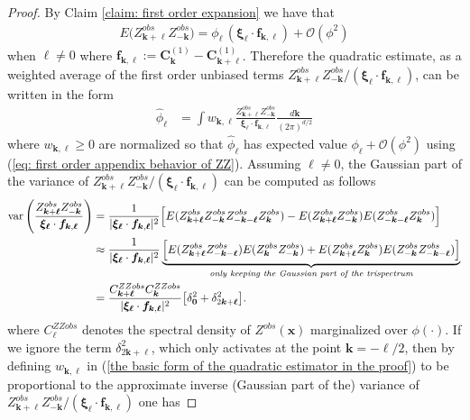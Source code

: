 \documentclass[10pt,noinfoline]{imsart}
\newcommand{\bs}{\boldsymbol}
\begin{document}
\begin{proof}
By Claim \ref{claim: first order expansion} we have that
\begin{align}
\label{eq: first order appendix behavior of ZZ}
E\big(Z^{obs}_{\bs k+\bs \ell}Z^{obs}_{-\bs k}\big)
= \phi_{\bs \ell}\, (\bs \xi_{\bs \ell}\cdot \bs f_{\bs k,\bs\ell})+ \mathcal O(\phi^2)
\end{align}
 when $\bs \ell\neq 0$ where $\bs f_{\bs k,\bs \ell}:= \bs C_{\bs k}^{(1)} -  \bs C_{\bs k+\bs \ell}^{(1)}$.
 Therefore the quadratic estimate, as a weighted average of the first order unbiased terms $Z^{obs}_{\bs k+\bs \ell}Z^{obs}_{-\bs k}/(\bs \xi_{\bs \ell}\cdot \bs f_{\bs k,\bs\ell})$, can be written in the form
\begin{align}
    \label{the basic form of the quadratic estimator in the proof}
\hat\phi_{\bs\ell}
& = \int w_{\bs k,\bs \ell}\frac{Z^{obs}_{\bs k+\bs \ell}Z^{obs}_{-\bs k}}{\bs \xi_{\bs \ell}\cdot \bs f_{\bs k,\bs\ell}} \frac{d\bs k}{{(2\pi)}^{d/2}}
\end{align}
where $w_{\bs k,\bs\ell}\geq 0$ are normalized so that $\hat\phi_{\bs\ell}$ has expected value $\phi_{\bs\ell} + \mathcal O(\phi^2)$ using (\ref{eq: first order appendix behavior of ZZ}). Assuming $\bs\ell\neq 0$, the Gaussian part of the variance of $Z^{obs}_{\bs k+\bs \ell}Z^{obs}_{-\bs k}/(\bs \xi_{\bs \ell}\cdot \bs f_{\bs k,\bs\ell})$ can be computed as follows
\begin{align*}
\text{var}\left(\frac{Z^{obs}_{\bs k+\bs \ell}Z^{obs}_{-\bs k}}{\bs \xi_{\bs \ell}\cdot \bs f_{\bs k,\bs\ell}}
\right) 
& = \frac{1}{|\bs \xi_{\bs \ell}\cdot \bs f_{\bs k,\bs\ell}|^2}\Big[E(Z^{obs}_{\bs k+\bs\ell}Z^{obs}_{-\bs k}Z^{obs}_{-\bs k-\bs\ell}Z^{obs}_{\bs k})  - E(Z^{obs}_{\bs k+\bs\ell}Z^{obs}_{-\bs k})E(Z^{obs}_{-\bs k-\bs\ell}Z^{obs}_{\bs k}) \Big] \\
&\approx \frac{1}{|\bs \xi_{\bs \ell}\cdot \bs f_{\bs k,\bs\ell}|^2}\underbrace{\Bigl[E(Z^{obs}_{\bs k+\bs\ell}Z^{obs}_{-\bs k-\bs\ell})E(Z^{obs}_{\bs k}Z^{obs}_{-\bs k})  + E(Z^{obs}_{\bs k+\bs\ell}Z^{obs}_{\bs k})E(Z^{obs}_{-\bs k}Z^{obs}_{-\bs k-\bs\ell}) \Bigr]}_{\textit{only keeping the Gaussian part of the trispectrum}} \\
& = \frac{C^{ZZobs}_{\bs k+\bs\ell} C^{ZZobs}_{\bs k}}{|\bs \xi_{\bs \ell}\cdot \bs f_{\bs k,\bs\ell}|^2}\big[\delta_{\bs 0}^2   + \delta_{2\bs k+\bs\ell}^2 \big].
\end{align*}
where $C^{ZZobs}_{\bs\ell}$ denotes the spectral density of $Z^{obs}(\bs x)$ marginalized over $\phi(\cdot)$.
If we ignore the term $\delta_{2\bs k+\bs\ell}^2$, which only activates at the point $\bs k = -\bs\ell/2$, then by defining $w_{\bs k,\bs \ell}$ in (\ref{the basic form of the quadratic estimator in the proof}) to be proportional to the approximate inverse (Gaussian part of the) variance of $Z^{obs}_{\bs k+\bs \ell}Z^{obs}_{-\bs k}/(\bs \xi_{\bs \ell}\cdot \bs f_{\bs k,\bs\ell})$ one has

\end{proof}
\end{document}
